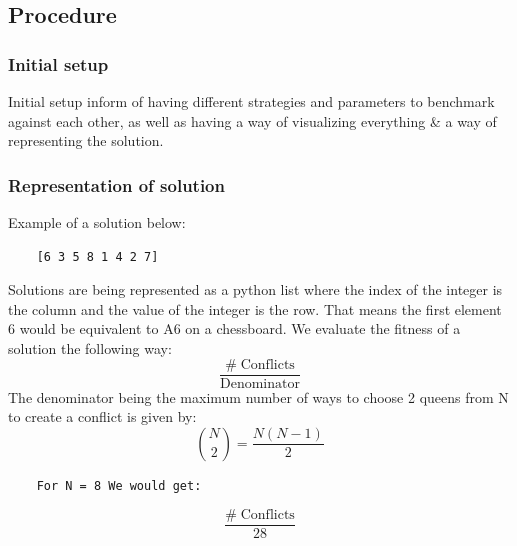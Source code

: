 \subsection{Procedure}
\subsubsection{Initial setup}
Initial setup inform of having different strategies and parameters to benchmark against each other, as well as having a way of visualizing everything \& a way of representing the solution.
\subsubsection{Representation of solution}
Example of a solution below:
\begin{verbatim}
    [6 3 5 8 1 4 2 7]
\end{verbatim}
Solutions are being represented as a python list where the index of the integer is the column and the value of the integer is the row. That means the first element 6 would be equivalent to A6 on a chessboard. We evaluate the fitness of a solution the following way:
\begin{equation}
    \frac{\text{\#}\; \text{Conflicts}}{\text{Denominator}}
\end{equation}
The denominator being the maximum number of ways to choose 2 queens from N to create a conflict is given by:
\begin{equation}
    \binom{N}{2} = \frac{N(N-1)}{2}
\end{equation}
\begin{verbatim}
    For N = 8 We would get:
\end{verbatim}
\begin{equation}
    \frac{\text{\#}\; \text{Conflicts}}{28}
\end{equation}
